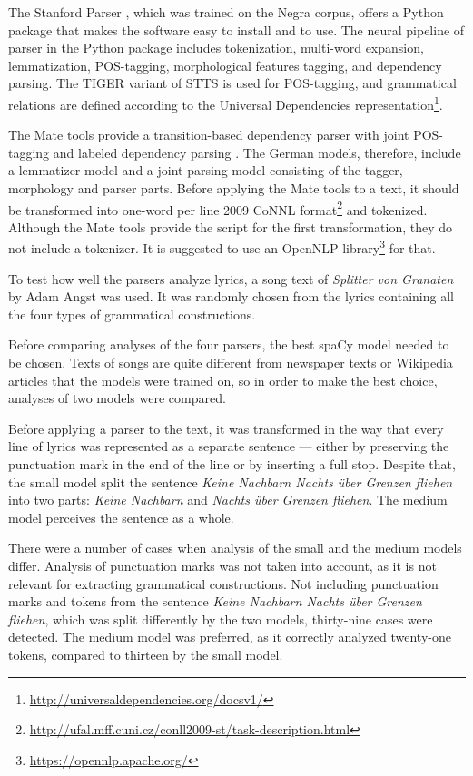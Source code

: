 The Stanford Parser \citep{Qi.2018}, which was trained on the Negra corpus, offers a Python package that makes the software easy to install and to use. The neural pipeline of parser in the Python package includes tokenization, multi-word expansion, lemmatization, POS-tagging, morphological features tagging, and dependency parsing. The TIGER variant of STTS is used for POS-tagging, and grammatical relations are defined according to the Universal Dependencies representation\footnote{\url{http://universaldependencies.org/docsv1/}}.

The Mate tools provide a transition-based dependency parser with joint POS-tagging and labeled dependency parsing \citep{Bohnet.2012}. The German models, therefore, include a lemmatizer model and a joint parsing model consisting of the tagger, morphology and parser parts. Before applying the Mate tools to a text, it should be transformed into one-word per line 2009 CoNNL format\footnote{\url{http://ufal.mff.cuni.cz/conll2009-st/task-description.html}} and tokenized. Although the Mate tools provide the script for the first transformation, they do not include a tokenizer. It is suggested to use an OpenNLP library\footnote{\url{https://opennlp.apache.org/}} for that.

To test how well the parsers analyze lyrics, a song text of \textit{Splitter von Granaten} by Adam Angst was used. It was randomly chosen from the lyrics containing all the four types of grammatical constructions.

Before comparing analyses of the four parsers, the best spaCy model needed to be chosen. Texts of songs are quite different from newspaper texts or Wikipedia articles that the models were trained on, so in order to make the best choice, analyses of two models were compared.

Before applying a parser to the text, it was transformed in the way that every line of lyrics was represented as a separate sentence --- either by preserving the punctuation mark in the end of the line or by inserting a full stop. Despite that, the small model split the sentence \textit{Keine Nachbarn Nachts über Grenzen fliehen} into two parts: \textit{Keine Nachbarn} and \textit{Nachts über Grenzen fliehen}. The medium model perceives the sentence as a whole. 

There were a number of cases when analysis of the small and the medium models differ. Analysis of punctuation marks was not taken into account, as it is not relevant for extracting grammatical constructions. Not including punctuation marks and tokens from the sentence \textit{Keine Nachbarn Nachts über Grenzen fliehen}, which was split differently by the two models, thirty-nine cases were detected. The medium model was preferred, as it correctly analyzed twenty-one tokens, compared to thirteen by the small model.

